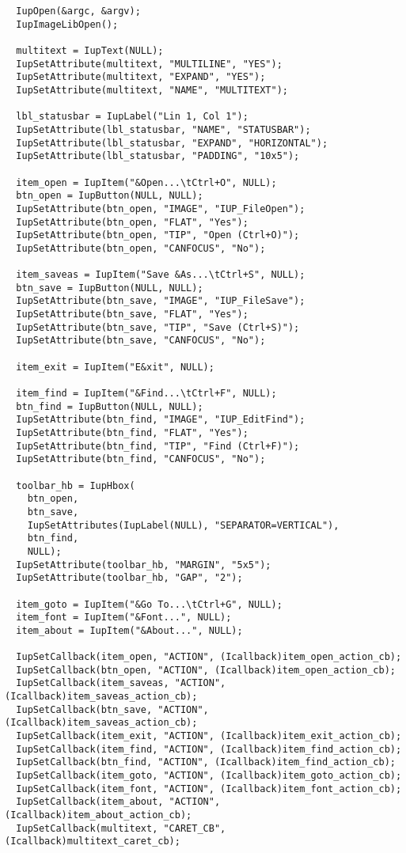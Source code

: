 \documentclass{ctexart}
\begin{document}
\begin{lstlisting}
  IupOpen(&argc, &argv);
  IupImageLibOpen();

  multitext = IupText(NULL);
  IupSetAttribute(multitext, "MULTILINE", "YES");
  IupSetAttribute(multitext, "EXPAND", "YES");
  IupSetAttribute(multitext, "NAME", "MULTITEXT");

  lbl_statusbar = IupLabel("Lin 1, Col 1");
  IupSetAttribute(lbl_statusbar, "NAME", "STATUSBAR");  
  IupSetAttribute(lbl_statusbar, "EXPAND", "HORIZONTAL");
  IupSetAttribute(lbl_statusbar, "PADDING", "10x5");

  item_open = IupItem("&Open...\tCtrl+O", NULL);
  btn_open = IupButton(NULL, NULL);
  IupSetAttribute(btn_open, "IMAGE", "IUP_FileOpen");
  IupSetAttribute(btn_open, "FLAT", "Yes");
  IupSetAttribute(btn_open, "TIP", "Open (Ctrl+O)");
  IupSetAttribute(btn_open, "CANFOCUS", "No");

  item_saveas = IupItem("Save &As...\tCtrl+S", NULL);
  btn_save = IupButton(NULL, NULL);
  IupSetAttribute(btn_save, "IMAGE", "IUP_FileSave");
  IupSetAttribute(btn_save, "FLAT", "Yes");
  IupSetAttribute(btn_save, "TIP", "Save (Ctrl+S)");
  IupSetAttribute(btn_save, "CANFOCUS", "No");

  item_exit = IupItem("E&xit", NULL);

  item_find = IupItem("&Find...\tCtrl+F", NULL);
  btn_find = IupButton(NULL, NULL);
  IupSetAttribute(btn_find, "IMAGE", "IUP_EditFind");
  IupSetAttribute(btn_find, "FLAT", "Yes");
  IupSetAttribute(btn_find, "TIP", "Find (Ctrl+F)");
  IupSetAttribute(btn_find, "CANFOCUS", "No");

  toolbar_hb = IupHbox(
    btn_open,
    btn_save,
    IupSetAttributes(IupLabel(NULL), "SEPARATOR=VERTICAL"),
    btn_find,
    NULL);
  IupSetAttribute(toolbar_hb, "MARGIN", "5x5");
  IupSetAttribute(toolbar_hb, "GAP", "2");

  item_goto = IupItem("&Go To...\tCtrl+G", NULL);
  item_font = IupItem("&Font...", NULL);
  item_about = IupItem("&About...", NULL);

  IupSetCallback(item_open, "ACTION", (Icallback)item_open_action_cb);
  IupSetCallback(btn_open, "ACTION", (Icallback)item_open_action_cb);
  IupSetCallback(item_saveas, "ACTION", (Icallback)item_saveas_action_cb);
  IupSetCallback(btn_save, "ACTION", (Icallback)item_saveas_action_cb);
  IupSetCallback(item_exit, "ACTION", (Icallback)item_exit_action_cb);
  IupSetCallback(item_find, "ACTION", (Icallback)item_find_action_cb);
  IupSetCallback(btn_find, "ACTION", (Icallback)item_find_action_cb);  
  IupSetCallback(item_goto, "ACTION", (Icallback)item_goto_action_cb);
  IupSetCallback(item_font, "ACTION", (Icallback)item_font_action_cb);
  IupSetCallback(item_about, "ACTION", (Icallback)item_about_action_cb);
  IupSetCallback(multitext, "CARET_CB", (Icallback)multitext_caret_cb);


\end{lstlisting}
\end{document}
